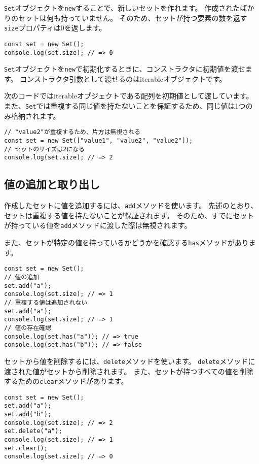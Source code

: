 \texttt{Set}オブジェクトを\texttt{new}することで、新しいセットを作れます。
作成されたばかりのセットは何も持っていません。
そのため、セットが持つ要素の数を返す\texttt{size}プロパティは0を返します。

\begin{lstlisting}
const set = new Set();
console.log(set.size); // => 0
\end{lstlisting}

\texttt{Set}オブジェクトを\texttt{new}で初期化するときに、コンストラクタに初期値を渡せます。
コンストラクタ引数として渡せるのはiterableオブジェクトです。

次のコードではiterableオブジェクトである配列を初期値として渡しています。
また、\texttt{Set}では重複する同じ値を持たないことを保証するため、同じ値は1つのみ格納されます。
\newpage
\begin{lstlisting}
// "value2"が重複するため、片方は無視される
const set = new Set(["value1", "value2", "value2"]);
// セットのサイズは2になる
console.log(set.size); // => 2
\end{lstlisting}

\hypertarget{set-read-and-write}{%
\subsection{値の追加と取り出し}\label{set-read-and-write}}

作成したセットに値を追加するには、\texttt{add}メソッドを使います。
先述のとおり、セットは重複する値を持たないことが保証されます。
そのため、すでにセットが持っている値を\texttt{add}メソッドに渡した際は無視されます。

また、セットが特定の値を持っているかどうかを確認する\texttt{has}メソッドがあります。

\begin{lstlisting}
const set = new Set();
// 値の追加
set.add("a");
console.log(set.size); // => 1
// 重複する値は追加されない
set.add("a");
console.log(set.size); // => 1
// 値の存在確認
console.log(set.has("a")); // => true
console.log(set.has("b")); // => false
\end{lstlisting}

セットから値を削除するには、\texttt{delete}メソッドを使います。
\texttt{delete}メソッドに渡された値がセットから削除されます。
また、セットが持つすべての値を削除するための\texttt{clear}メソッドがあります。

\begin{lstlisting}
const set = new Set();
set.add("a");
set.add("b");
console.log(set.size); // => 2
set.delete("a");
console.log(set.size); // => 1
set.clear();
console.log(set.size); // => 0
\end{lstlisting}

